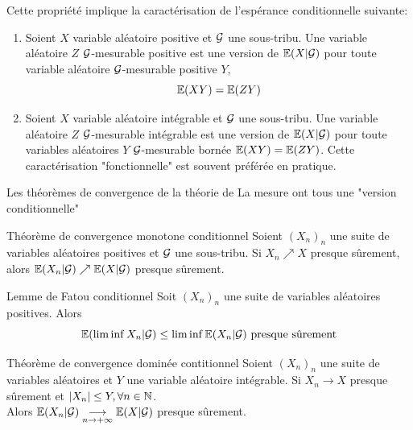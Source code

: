 \documentclass[]{report}
\begin{document}
    \begin{re}{}{}
        Cette propriété implique la caractérisation de l'espérance conditionnelle suivante:
        \begin{enumerate}
            \item Soient $X$ variable aléatoire positive et $\mathcal{G}$ une sous-tribu. Une variable aléatoire $Z$ $\mathcal{G}$-mesurable positive est une version de $\mathbb{E}(X|\mathcal{G})$ \ssi pour toute variable aléatoire $\mathcal{G}$-mesurable positive $Y$,
            \[\mathbb{E}(XY)=\mathbb{E}(ZY)\]
            \item Soient $X$ variable aléatoire intégrable et $\mathcal{G}$ une sous-tribu. Une variable aléatoire $Z$ $\mathcal{G}$-mesurable intégrable est une version de $\mathbb{E}(X|\mathcal{G})$ \ssi pour toute variables aléatoires $Y$ $\mathcal{G}$-mesurable bornée $\mathbb{E}(XY)=\mathbb{E}(ZY)$. Cette caractérisation "fonctionnelle" est souvent préférée en pratique.
        \end{enumerate}
    \end{re}

    Les théorèmes de convergence de la théorie de La mesure ont tous une "version conditionnelle"

    \begin{prop}{Théorème de convergence monotone conditionnel}{}
        Soient $(X_n)_n$ une suite de variables aléatoires positives et $\mathcal{G}$ une sous-tribu. Si $X_n\nearrow X$ presque sûrement, alors $\mathbb{E}(X_n|\mathcal{G})\nearrow \mathbb{E}(X|\mathcal{G})$ presque sûrement.
    \end{prop}

    \begin{prop}{Lemme de Fatou conditionnel}{}
        Soit $(X_n)_n$ une suite de variables aléatoires positives. Alors
        \[\mathbb{E}(\liminf X_n|\mathcal{G})\le \liminf \mathbb{E}(X_n|\mathcal{G})\text{ presque sûrement}\]
    \end{prop}

    \begin{prop}{Théorème de convergence dominée contitionnel}{}
        Soient $(X_n)_n$ une suite de variables aléatoires et $Y$ une variable aléatoire intégrable. Si $X_n\to X$ presque sûrement et $|X_n|\le Y,\forall n\in \mathbb{N}$.\\
        Alors $\mathbb{E}(X_n|\mathcal{G})\underset{n\to +\infty}{\longrightarrow}\mathbb{E}(X|\mathcal{G})$ presque sûrement.
    \end{prop}
\end{document}
